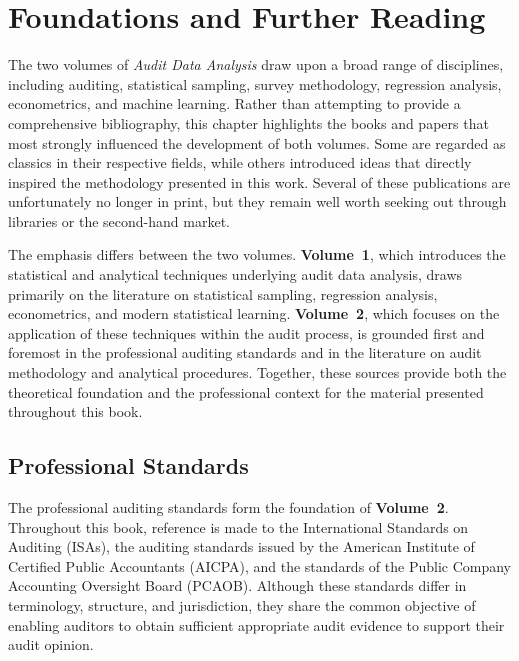 
\chapter{Foundations and Further Reading}
\label{chap:foundations_and_further_reading}

The two volumes of \textit{Audit Data Analysis} draw upon a broad range of disciplines, including auditing, statistical sampling, survey methodology, regression analysis, econometrics, and machine learning. Rather than attempting to provide a comprehensive bibliography, this chapter highlights the books and papers that most strongly influenced the development of both volumes. Some are regarded as classics in their respective fields, while others introduced ideas that directly inspired the methodology presented in this work. Several of these publications are unfortunately no longer in print, but they remain well worth seeking out through libraries or the second-hand market.

The emphasis differs between the two volumes. \textbf{Volume~1}, which introduces the statistical and analytical techniques underlying audit data analysis, draws primarily on the literature on statistical sampling, regression analysis, econometrics, and modern statistical learning. \textbf{Volume~2}, which focuses on the application of these techniques within the audit process, is grounded first and foremost in the professional auditing standards and in the literature on audit methodology and analytical procedures. Together, these sources provide both the theoretical foundation and the professional context for the material presented throughout this book.

\section*{Professional Standards}

The professional auditing standards form the foundation of \textbf{Volume~2}. Throughout this book, reference is made to the International Standards on Auditing (ISAs), the auditing standards issued by the American Institute of Certified Public Accountants (AICPA), and the standards of the Public Company Accounting Oversight Board (PCAOB). Although these standards differ in terminology, structure, and jurisdiction, they share the common objective of enabling auditors to obtain sufficient appropriate audit evidence to support their audit opinion.

